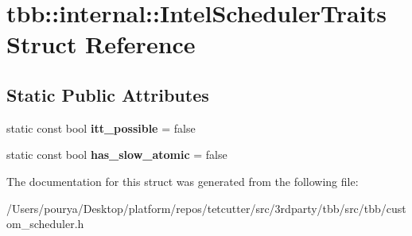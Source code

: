 \hypertarget{structtbb_1_1internal_1_1IntelSchedulerTraits}{}\section{tbb\+:\+:internal\+:\+:Intel\+Scheduler\+Traits Struct Reference}
\label{structtbb_1_1internal_1_1IntelSchedulerTraits}
\subsection*{Static Public Attributes}
\begin{DoxyCompactItemize}
\item 
\hypertarget{structtbb_1_1internal_1_1IntelSchedulerTraits_ab4bf8a123648698ac58bb407e6c88c3b}{}static const bool {\bfseries itt\+\_\+possible} = false\label{structtbb_1_1internal_1_1IntelSchedulerTraits_ab4bf8a123648698ac58bb407e6c88c3b}

\item 
\hypertarget{structtbb_1_1internal_1_1IntelSchedulerTraits_ab9635ca5fb38f8b4d9aade6e78b1cda3}{}static const bool {\bfseries has\+\_\+slow\+\_\+atomic} = false\label{structtbb_1_1internal_1_1IntelSchedulerTraits_ab9635ca5fb38f8b4d9aade6e78b1cda3}

\end{DoxyCompactItemize}


The documentation for this struct was generated from the following file\+:\begin{DoxyCompactItemize}
\item 
/\+Users/pourya/\+Desktop/platform/repos/tetcutter/src/3rdparty/tbb/src/tbb/custom\+\_\+scheduler.\+h\end{DoxyCompactItemize}
